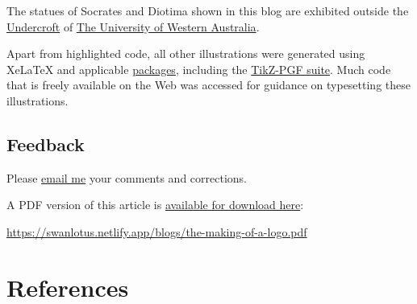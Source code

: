 \documentclass[
  a4paper,
]{article}
\begin{document}
The statues of Socrates and Diotima shown in this blog are exhibited
outside the
\href{https://www.uwa.edu.au/theatres/venues/undercroft}{Undercroft} of
\href{https://www.uwa.edu.au/}{The University of Western Australia}.

Apart from highlighted code, all other illustrations were generated
using XeLaTeX and applicable
\href{https://ctan.org/pkg?lang=en}{packages}, including the
\href{https://github.com/pgf-tikz/pgf}{TikZ-PGF suite}. Much code that
is freely available on the Web was accessed for guidance on typesetting
these illustrations.

\hypertarget{feedback}{%
\subsection{Feedback}\label{feedback}}

Please \href{mailto:feedback.swanlotus@gmail.com}{email me} your
comments and corrections.

\noindent A PDF version of this article is
\href{./the-making-of-a-logo.pdf}{available for download here}:

\begin{small}

\begin{sffamily}

\url{https://swanlotus.netlify.app/blogs/the-making-of-a-logo.pdf}

\end{sffamily}

\end{small}

\hypertarget{bibliography}{%
\section*{References}\label{bibliography}}
\end{document}
